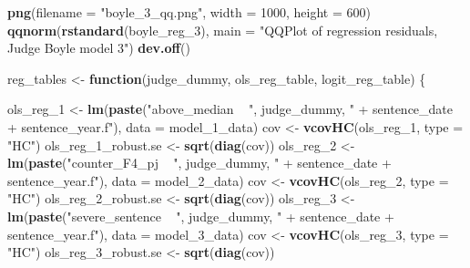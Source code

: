 \documentclass[
]{article}
\newenvironment{Shaded}{\begin{snugshade}}{\end{snugshade}}
\newcommand{\ControlFlowTok}[1]{\textcolor[rgb]{0.13,0.29,0.53}{\textbf{#1}}}
\newcommand{\DataTypeTok}[1]{\textcolor[rgb]{0.13,0.29,0.53}{#1}}
\newcommand{\DecValTok}[1]{\textcolor[rgb]{0.00,0.00,0.81}{#1}}
\newcommand{\KeywordTok}[1]{\textcolor[rgb]{0.13,0.29,0.53}{\textbf{#1}}}
\newcommand{\NormalTok}[1]{#1}
\newcommand{\StringTok}[1]{\textcolor[rgb]{0.31,0.60,0.02}{#1}}
\begin{document}
\begin{Shaded}
\begin{Highlighting}[]
\KeywordTok{png}\NormalTok{(}\DataTypeTok{filename =} \StringTok{"boyle_3_qq.png"}\NormalTok{, }\DataTypeTok{width =} \DecValTok{1000}\NormalTok{, }\DataTypeTok{height =} \DecValTok{600}\NormalTok{)}
\KeywordTok{qqnorm}\NormalTok{(}\KeywordTok{rstandard}\NormalTok{(boyle_reg_}\DecValTok{3}\NormalTok{), }\DataTypeTok{main =} \StringTok{"QQPlot of regression residuals, Judge Boyle model 3"}\NormalTok{)}
\KeywordTok{dev.off}\NormalTok{()}

\NormalTok{reg_tables <-}\StringTok{ }\ControlFlowTok{function}\NormalTok{(judge_dummy, ols_reg_table, logit_reg_table) \{}
    
\NormalTok{    ols_reg_}\DecValTok{1}\NormalTok{ <-}\StringTok{ }\KeywordTok{lm}\NormalTok{(}\KeywordTok{paste}\NormalTok{(}\StringTok{"above_median ~ "}\NormalTok{, judge_dummy, }\StringTok{" + sentence_date + sentence_year.f"}\NormalTok{), }
        \DataTypeTok{data =}\NormalTok{ model_}\DecValTok{1}\NormalTok{_data)}
\NormalTok{    cov <-}\StringTok{ }\KeywordTok{vcovHC}\NormalTok{(ols_reg_}\DecValTok{1}\NormalTok{, }\DataTypeTok{type =} \StringTok{"HC"}\NormalTok{)}
\NormalTok{    ols_reg_}\DecValTok{1}\NormalTok{_robust.se <-}\StringTok{ }\KeywordTok{sqrt}\NormalTok{(}\KeywordTok{diag}\NormalTok{(cov))}
\NormalTok{    ols_reg_}\DecValTok{2}\NormalTok{ <-}\StringTok{ }\KeywordTok{lm}\NormalTok{(}\KeywordTok{paste}\NormalTok{(}\StringTok{"counter_F4_pj ~ "}\NormalTok{, judge_dummy, }\StringTok{" + sentence_date + sentence_year.f"}\NormalTok{), }
        \DataTypeTok{data =}\NormalTok{ model_}\DecValTok{2}\NormalTok{_data)}
\NormalTok{    cov <-}\StringTok{ }\KeywordTok{vcovHC}\NormalTok{(ols_reg_}\DecValTok{2}\NormalTok{, }\DataTypeTok{type =} \StringTok{"HC"}\NormalTok{)}
\NormalTok{    ols_reg_}\DecValTok{2}\NormalTok{_robust.se <-}\StringTok{ }\KeywordTok{sqrt}\NormalTok{(}\KeywordTok{diag}\NormalTok{(cov))}
\NormalTok{    ols_reg_}\DecValTok{3}\NormalTok{ <-}\StringTok{ }\KeywordTok{lm}\NormalTok{(}\KeywordTok{paste}\NormalTok{(}\StringTok{"severe_sentence ~ "}\NormalTok{, judge_dummy, }\StringTok{" + sentence_date + sentence_year.f"}\NormalTok{), }
        \DataTypeTok{data =}\NormalTok{ model_}\DecValTok{3}\NormalTok{_data)}
\NormalTok{    cov <-}\StringTok{ }\KeywordTok{vcovHC}\NormalTok{(ols_reg_}\DecValTok{3}\NormalTok{, }\DataTypeTok{type =} \StringTok{"HC"}\NormalTok{)}
\NormalTok{    ols_reg_}\DecValTok{3}\NormalTok{_robust.se <-}\StringTok{ }\KeywordTok{sqrt}\NormalTok{(}\KeywordTok{diag}\NormalTok{(cov))}
    

\end{Highlighting}
\end{Shaded}
\end{document}
